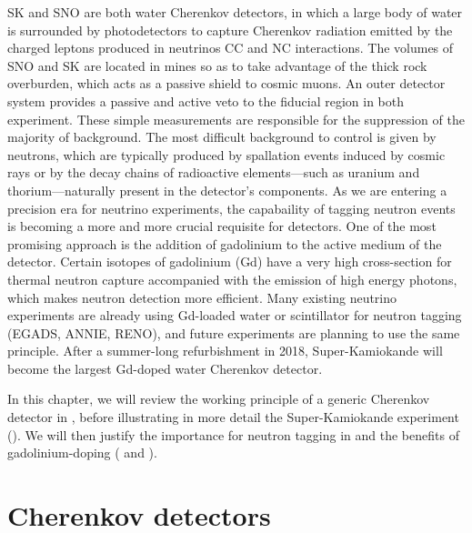 SK and SNO are both water Cherenkov detectors, in which a large body of water is surrounded by %
photodetectors to capture Cherenkov radiation emitted by the charged leptons produced in neutrinos CC and NC interactions.
The volumes of SNO and SK are located in mines so as to take advantage of the thick rock overburden, %
which acts as a passive shield to cosmic muons.
An outer detector system provides a passive and active veto to the fiducial region in both experiment.
These simple measurements are responsible for the suppression of the majority of background.
The most difficult background to control is given by neutrons, which are typically produced by spallation events %
induced by cosmic rays or by the decay chains of radioactive elements---such as uranium and thorium---naturally %
present in the detector's components.
As we are entering a precision era for neutrino experiments, the capabaility of tagging neutron %
events is becoming a more and more crucial requisite for detectors.
One of the most promising approach is the addition of gadolinium to the active medium of the detector.
Certain isotopes of gadolinium (Gd) have a very high cross-section for thermal neutron capture %
accompanied with the emission of high energy photons, which makes neutron detection more efficient.
Many existing neutrino experiments are already using Gd-loaded water or scintillator for neutron tagging %
(EGADS, ANNIE, RENO), %
and future experiments are planning to use the same principle.
After a summer-long refurbishment in 2018, Super-Kamiokande will become the largest Gd-doped water Cherenkov detector.

In this chapter, we will review the working principle of a generic Cherenkov detector in , %
before illustrating in more detail the Super-Kamiokande experiment ().
We will then justify the importance for neutron tagging in  %
and the benefits of gadolinium-doping ( and ).

\section{Cherenkov detectors}
\label{sec:wch}


